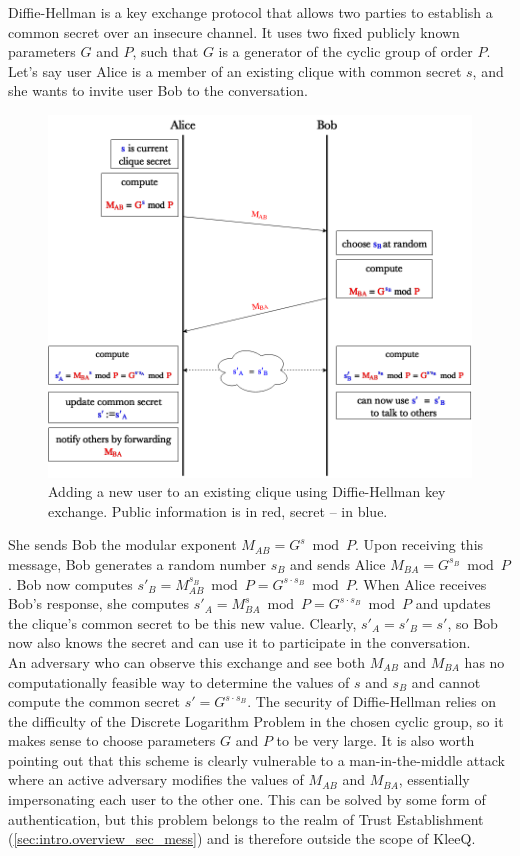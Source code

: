 \documentclass[a4paper, 12pt]{report}
\begin{document}
Diffie-Hellman is a key exchange protocol that allows two parties to establish a common secret over an insecure channel. It uses two fixed publicly known parameters $G$ and $P$, such that $G$ is a generator of the cyclic group of order $P$. Let's say user Alice is a member of an existing clique with common secret $s$, and she wants to invite user Bob to the conversation. 
\begin{figure}[h]
    \captionsetup{width=0.8\textwidth}
    \centering
    \includegraphics[width = 0.85 \linewidth]{pics/DH.png}
    \caption{Adding a new user to an existing clique using Diffie-Hellman key exchange. Public information is in {\color{red}red}, secret -- in {\color{blue}blue}.}
    \label{fig:DH}
\end{figure}

She sends Bob the modular exponent $M_{AB} = G^{s} \bmod P$. Upon receiving this message, Bob generates a random number $s_B$ and sends Alice $M_{BA} = G^{s_B} \bmod P$. Bob now computes $s'_B = M_{AB}^{s_B} \bmod P = G^{s \cdot s_B} \bmod P$. When Alice receives Bob's response, she computes $s'_A = M_{BA}^{s} \bmod P = G^{s \cdot s_B} \bmod P$ and updates the clique's common secret to be this new value. Clearly, $s'_A = s'_B = s'$, so Bob now also knows the secret and can use it to participate in the conversation. \\

An adversary who can observe this exchange and see both $M_{AB}$ and $M_{BA}$ has no computationally feasible way to determine the values of $s$ and $s_B$ and cannot compute the common secret $s' = G^{s \cdot s_B}$. The security of Diffie-Hellman relies on the difficulty of the Discrete Logarithm Problem in the chosen cyclic group, so it makes sense to choose parameters $G$ and $P$ to be very large. It is also worth pointing out  that this scheme is clearly vulnerable to a man-in-the-middle attack where an active adversary modifies the values of $M_{AB}$ and $M_{BA}$, essentially impersonating each user to the other one. This can be solved by some form of authentication, but this problem belongs to the realm of Trust Establishment (\cref{sec:intro.overview_sec_mess}) and is therefore outside the scope of KleeQ.
\end{document}
